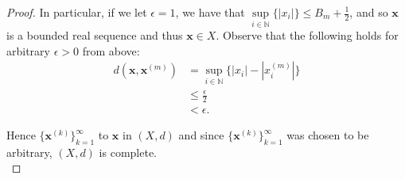\begin{proof}
 In particular, if we let $\epsilon = 1$, we have that 
 $\sup\limits_{i \in \mathbb{N}}{\{|x_i|\}} \le B_m + \frac{1}{2}$, and so $\textbf{x}$ is a bounded real sequence and 
 thus $\textbf{x} \in X$. Observe that the following holds for arbitrary $\epsilon > 0$ from above:
 \begin{align*}
   d(\textbf{x}, \textbf{x}^{(m)}) &= \sup\limits_{i \in \mathbb{N}}{\{|x_i| - |x_i^{(m)}|\}}  \\
                                   &\le \frac{\epsilon}{2} \\
                                   &< \epsilon.
 \end{align*}

 Hence $\{\textbf{x}^{(k)}\}_{k=1}^{\infty}$ to $\textbf{x}$ in $(X, d)$ and since $\{\textbf{x}^{(k)}\}_{k=1}^{\infty}$
 was chosen to be arbitrary, $(X, d)$ is complete.
 \\
\end{proof}

\pagebreak